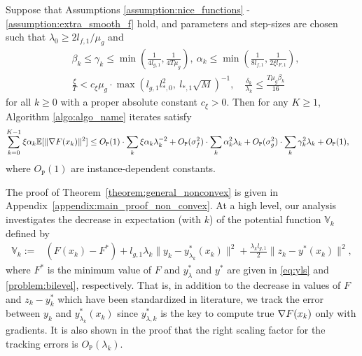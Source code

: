\begin{theorem}
    \label{theorem:general_nonconvex}
    Suppose that Assumptions \ref{assumption:nice_functions} - \ref{assumption:extra_smooth_f} hold, and parameters and step-sizes are chosen such that $\lambda_0 \ge 2l_{f,1} / \mu_g$ and
    \begin{subequations}
    \label{eq:step_size_theorem}
    \begin{align}
        & \beta_k \le \gamma_k \le \min \left(\frac{1}{4 l_{g,1}}, \frac{1}{4 T \mu_g} \right), \ \alpha_k \le \min \left( \frac{1}{8 l_{f,1}}, \frac{1}{2 \xi l_{F,1}} \right), \label{eq:step_size_theorema} \\
        & \frac{\xi}{T} < c_\xi \mu_g \cdot \max \left( l_{g,1} l_{*,0}^2, \ l_{*,1} \sqrt{M} \right)^{-1}, \quad \frac{\delta_k}{\lambda_k} \le \frac{T \mu_g \beta_k}{16} \label{eq:step_size_theoremb}
    \end{align}
    \end{subequations}
    for all $k \ge 0$ with a proper absolute constant $c_\xi > 0$. Then for any $K \ge 1$, Algorithm \ref{algo:algo_name} iterates satisfy
    \begin{align*}
        \sum_{k=0}^{K-1} \xi \alpha_k \mathbb{E}[\|\nabla F(x_k)\|^2] &\le O_{\texttt{P}} (1) \cdot \sum_{k} \xi\alpha_k\lambda_k^{-2} + O_{\texttt{P}}(\sigma_f^2) \cdot \sum_{k} \alpha_k^2 \lambda_k + O_{\texttt{P}}(\sigma_g^2) \cdot \sum_{k} \gamma_k^2 \lambda_k + O_{\texttt{P}} (1), 
    \end{align*}
    where $O_{\texttt{P}}(1)$ are instance-dependent constants.
\end{theorem}
The proof of Theorem~\ref{theorem:general_nonconvex} is given in Appendix~\ref{appendix:main_proof_non_convex}. At a high level, our analysis investigates the decrease in expectation (with $k$) of the potential function $\mathbb{V}_k$ defined by
\begin{align}
\label{eq:pot0}
    \mathbb{V}_k := &(F(x_k) - F^*) + l_{g,1} \lambda_k \|y_k - y_{\lambda_k}^* (x_k)\|^2  + \frac{\lambda_k l_{g,1}}{2} \|z_k - y^*(x_k)\|^2,
\end{align}
where $F^*$ is the minimum value of $F$ and $y^*_{\lambda}$ and $y^*$ are given in \eqref{eq:yls} and \eqref{problem:bilevel}, respectively. That is, in addition to the decrease in values of $F$ and $z_k - y_k^*$ which have been standardized in literature, we track the error between $y_k$ and $y_{\lambda_k}^* (x_k)$ since $y_{\lambda, k}^*$ is the key to compute true $\nabla F(x_k)$ only with gradients. It is also shown in the proof that the right scaling factor for the tracking errors is $O_{\texttt{P}}(\lambda_k)$. 





